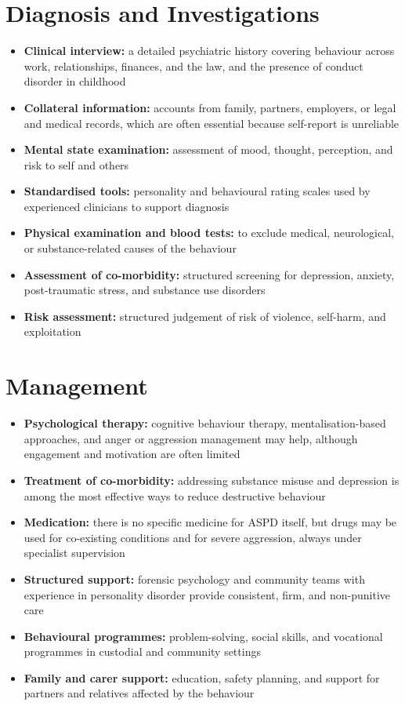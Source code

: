 \section*{Diagnosis and Investigations}
\begin{itemize}
    \item \textbf{Clinical interview:} a detailed psychiatric history covering behaviour across work, relationships, finances, and the law, and the presence of conduct disorder in childhood
    \item \textbf{Collateral information:} accounts from family, partners, employers, or legal and medical records, which are often essential because self-report is unreliable
    \item \textbf{Mental state examination:} assessment of mood, thought, perception, and risk to self and others
    \item \textbf{Standardised tools:} personality and behavioural rating scales used by experienced clinicians to support diagnosis
    \item \textbf{Physical examination and blood tests:} to exclude medical, neurological, or substance-related causes of the behaviour
    \item \textbf{Assessment of co-morbidity:} structured screening for depression, anxiety, post-traumatic stress, and substance use disorders
    \item \textbf{Risk assessment:} structured judgement of risk of violence, self-harm, and exploitation
\end{itemize}

\section*{Management}
\begin{itemize}
    \item \textbf{Psychological therapy:} cognitive behaviour therapy, mentalisation-based approaches, and anger or aggression management may help, although engagement and motivation are often limited
    \item \textbf{Treatment of co-morbidity:} addressing substance misuse and depression is among the most effective ways to reduce destructive behaviour
    \item \textbf{Medication:} there is no specific medicine for ASPD itself, but drugs may be used for co-existing conditions and for severe aggression, always under specialist supervision
    \item \textbf{Structured support:} forensic psychology and community teams with experience in personality disorder provide consistent, firm, and non-punitive care
    \item \textbf{Behavioural programmes:} problem-solving, social skills, and vocational programmes in custodial and community settings
    \item \textbf{Family and carer support:} education, safety planning, and support for partners and relatives affected by the behaviour
\end{itemize}

